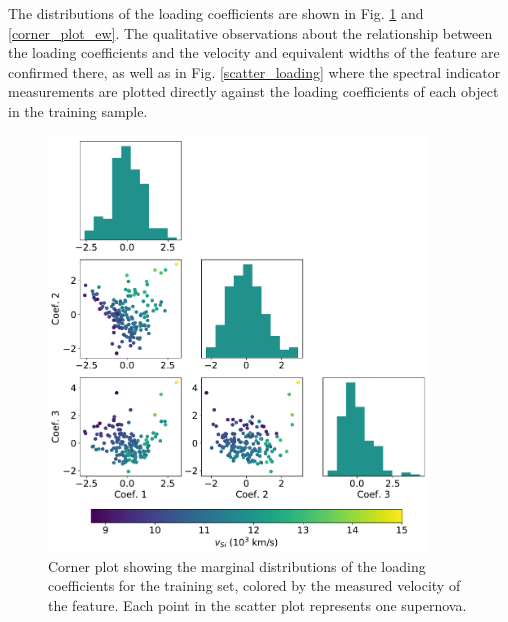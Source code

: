 The distributions of the loading coefficients are shown in Fig. \ref{corner_plot_vel} and \ref{corner_plot_ew}. The qualitative observations about the relationship between the loading coefficients and the velocity and equivalent widths of the feature are confirmed there, as well as in Fig. \ref{scatter_loading} where the spectral indicator measurements are plotted directly against the loading coefficients of each object in the training sample.

\begin{figure}[htbp]
    \centering
    \includegraphics[width=0.9\textwidth]{figures/si_feat_pca/corner_plot_vel.pdf}
    \caption{Corner plot showing the marginal distributions of the loading coefficients for the training set, colored by the measured velocity of the \siliconii\; feature. Each point in the scatter plot represents one supernova.}
    \label{corner_plot_vel}
\end{figure}

